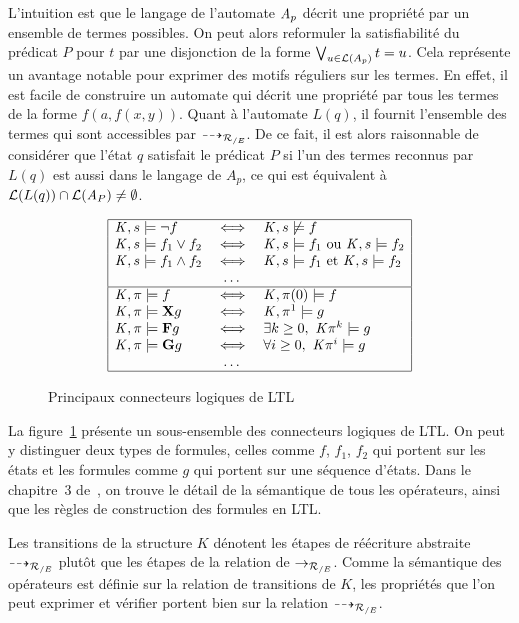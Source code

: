 L'intuition est que le langage de l'automate $\mathit A_p$ décrit une propriété par un ensemble de termes possibles.
On peut alors reformuler la satisfiabilité du prédicat $P$ pour $t$ par une disjonction de la forme 
$\bigvee_{u \in \mathcal{L}(A_p)} t = u$.
Cela représente un avantage notable pour exprimer des motifs réguliers sur les termes. En effet, il est facile 
de construire un automate qui décrit une propriété par tous les termes de la forme $f(a, f(x, y))$.
Quant à l'automate $L(q)$, il fournit l'ensemble des termes qui sont accessibles par $\dashrightarrow_{\mathcal R_{/E}}$.
De ce fait, il est alors raisonnable de considérer que l'état $q$ satisfait le prédicat $P$ si l'un des termes reconnus par $L(q)$ est aussi
dans le langage de $A_p$, ce qui est équivalent à $\mathcal{L}{}(L(q)) \cap \mathcal{L}{}(\mathit A_P) \neq \emptyset$.
\begin{figure}[ht!]
  \centering
  \[\begin{array}{|lcl|}
    \hline
    \mathit K, s \models \neg f & \; \Longleftrightarrow \; &  \mathit K, s \not\models f\\
    \mathit K, s \models f_1 \lor f_2 & \; \Longleftrightarrow \; & \mathit K, s \models f_1 \textrm{ ou } \mathit K, s \models f_2\\
    \mathit K, s \models f_1 \land f_2 & \; \Longleftrightarrow \; & \mathit K, s \models f_1 \textrm{ et } \mathit K, s \models f_2\\
    &\dots&\\
    \hline
    \mathit K, \pi \models f & \; \Longleftrightarrow \; & \mathit K, \pi(0) \models f\\
    \mathit K, \pi \models \mathbf X g & \; \Longleftrightarrow \; & \mathit K, \pi^1 \models g\\
    \mathit K, \pi \models \mathbf F g & \; \Longleftrightarrow \; & \exists k \ge 0,\ \mathit K \pi^k \models g \\
    \mathit K, \pi \models \mathbf G g & \; \Longleftrightarrow \; & \forall i \ge 0,\ \mathit K \pi^i \models g \\
    &\dots&\\
    \hline
  \end{array}\]
  \caption{Principaux connecteurs logiques de LTL}
  \label{fig:operateursLTL}
\end{figure}
La figure~\ref{fig:operateursLTL} présente un sous-ensemble des
connecteurs logiques de LTL. On peut y distinguer deux types de
formules, celles comme $f$, $f_1$, $f_2$ qui portent sur les états
et les formules comme $g$ qui portent sur une séquence d'états.  Dans le chapitre~3
de~\cite{MC-Book}, on trouve le détail de la sémantique de tous les
opérateurs, ainsi que les règles de construction des formules en LTL.


Les transitions de la structure $K$ dénotent les étapes de réécriture abstraite $\dashrightarrow_{{\mathcal R_{/E}}}$
plutôt que les étapes de la relation de $\rightarrow_{\mathcal R_{/E}}$. Comme la sémantique des opérateurs est définie
sur la relation de transitions de $K$, les propriétés que l'on peut exprimer et vérifier portent bien
sur la relation $\dashrightarrow_{\mathcal R_{/E}}$.

